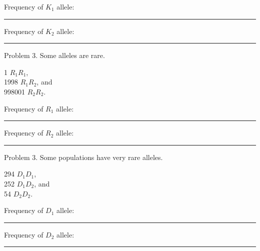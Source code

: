 \documentclass[letterpaper]{tufte-handout}
\begin{document}
\vspace{\baselineskip}

Frequency of $K_1$ allele: \rule{1in}{0.4pt} 

\vspace{\baselineskip}

Frequency of $K_2$ allele: \rule{1in}{0.4pt} 

\vspace{\baselineskip}

\noindent Problem 3. Some alleles are rare.\vspace{\baselineskip}

1 $R_1R_1$, \\
1998 $R_1R_2$, and \\
998001 $R_2R_2$.

\vspace{\baselineskip}

Frequency of $R_1$ allele: \rule{1in}{0.4pt} 

\vspace{\baselineskip}

Frequency of $R_2$ allele: \rule{1in}{0.4pt} 

\vspace{\baselineskip}

\noindent Problem 3. Some populations have very rare alleles.\vspace{\baselineskip}

294 $D_1D_1$, \\
252 $D_1D_2$, and \\
54 $D_2D_2$.

\vspace{\baselineskip}

Frequency of $D_1$ allele: \rule{1in}{0.4pt} 

\vspace{\baselineskip}

Frequency of $D_2$ allele: \rule{1in}{0.4pt} 
\end{document}
